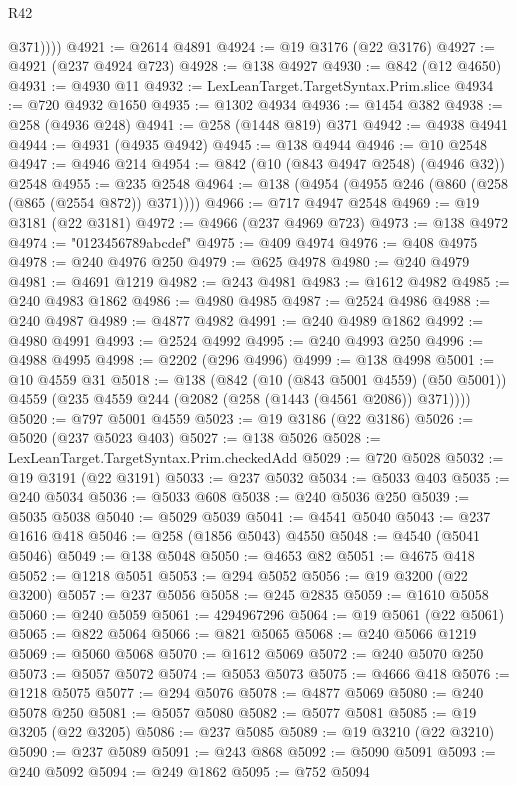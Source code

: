 \begin{lexlean}{R42}
\begin{coremodule}
{            @371))))
@4921 := @2614 @4891
@4924 := @19 @3176 (@22 @3176)
@4927 := @4921 (@237 @4924 @723)
@4928 := @138 @4927
@4930 := @842 (@12 @4650)
@4931 := @4930 @11
@4932 := LexLeanTarget.TargetSyntax.Prim.slice
@4934 := @720 @4932 @1650
@4935 := @1302 @4934
@4936 := @1454 @382
@4938 := @258 (@4936 @248)
@4941 := @258 (@1448 @819) @371
@4942 := @4938 @4941
@4944 := @4931 (@4935 @4942)
@4945 := @138 @4944
@4946 := @10 @2548
@4947 := @4946 @214
@4954 := @842 (@10 (@843 @4947 @2548) (@4946 @32)) @2548
@4955 := @235 @2548
@4964 := @138 (@4954 (@4955 @246 (@860 (@258 (@865 (@2554 @872)) @371))))
@4966 := @717 @4947 @2548
@4969 := @19 @3181 (@22 @3181)
@4972 := @4966 (@237 @4969 @723)
@4973 := @138 @4972
@4974 := "0123456789abcdef"
@4975 := @409 @4974
@4976 := @408 @4975
@4978 := @240 @4976 @250
@4979 := @625 @4978
@4980 := @240 @4979
@4981 := @4691 @1219
@4982 := @243 @4981
@4983 := @1612 @4982
@4985 := @240 @4983 @1862
@4986 := @4980 @4985
@4987 := @2524 @4986
@4988 := @240 @4987
@4989 := @4877 @4982
@4991 := @240 @4989 @1862
@4992 := @4980 @4991
@4993 := @2524 @4992
@4995 := @240 @4993 @250
@4996 := @4988 @4995
@4998 := @2202 (@296 @4996)
@4999 := @138 @4998
@5001 := @10 @4559 @31
@5018 := @138
    (@842
      (@10 (@843 @5001 @4559) (@50 @5001))
      @4559
      (@235 @4559 @244 (@2082 (@258 (@1443 (@4561 @2086)) @371))))
@5020 := @797 @5001 @4559
@5023 := @19 @3186 (@22 @3186)
@5026 := @5020 (@237 @5023 @403)
@5027 := @138 @5026
@5028 := LexLeanTarget.TargetSyntax.Prim.checkedAdd
@5029 := @720 @5028
@5032 := @19 @3191 (@22 @3191)
@5033 := @237 @5032
@5034 := @5033 @403
@5035 := @240 @5034
@5036 := @5033 @608
@5038 := @240 @5036 @250
@5039 := @5035 @5038
@5040 := @5029 @5039
@5041 := @4541 @5040
@5043 := @237 @1616 @418
@5046 := @258 (@1856 @5043) @4550
@5048 := @4540 (@5041 @5046)
@5049 := @138 @5048
@5050 := @4653 @82
@5051 := @4675 @418
@5052 := @1218 @5051
@5053 := @294 @5052
@5056 := @19 @3200 (@22 @3200)
@5057 := @237 @5056
@5058 := @245 @2835
@5059 := @1610 @5058
@5060 := @240 @5059
@5061 := 4294967296
@5064 := @19 @5061 (@22 @5061)
@5065 := @822 @5064
@5066 := @821 @5065
@5068 := @240 @5066 @1219
@5069 := @5060 @5068
@5070 := @1612 @5069
@5072 := @240 @5070 @250
@5073 := @5057 @5072
@5074 := @5053 @5073
@5075 := @4666 @418
@5076 := @1218 @5075
@5077 := @294 @5076
@5078 := @4877 @5069
@5080 := @240 @5078 @250
@5081 := @5057 @5080
@5082 := @5077 @5081
@5085 := @19 @3205 (@22 @3205)
@5086 := @237 @5085
@5089 := @19 @3210 (@22 @3210)
@5090 := @237 @5089
@5091 := @243 @868
@5092 := @5090 @5091
@5093 := @240 @5092
@5094 := @249 @1862
@5095 := @752 @5094
}
\end{coremodule}
\end{lexlean}
